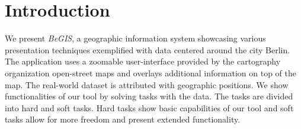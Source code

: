 \section*{Introduction}
We present \emph{BeGIS}, a geographic information system
showcasing various presentation techniques exemplified with
data centered around the city Berlin.
The application uses a zoomable user-interface provided
by the cartography organization open-street maps and overlays
additional information on top of the map.
The real-world dataset is
attributed with geographic positions.
We show functionalities of our tool by solving tasks with the data.
The tasks are divided into hard and soft tasks.
Hard tasks show basic capabilities
of our tool and soft tasks allow for more freedom
and present extended functionality.
